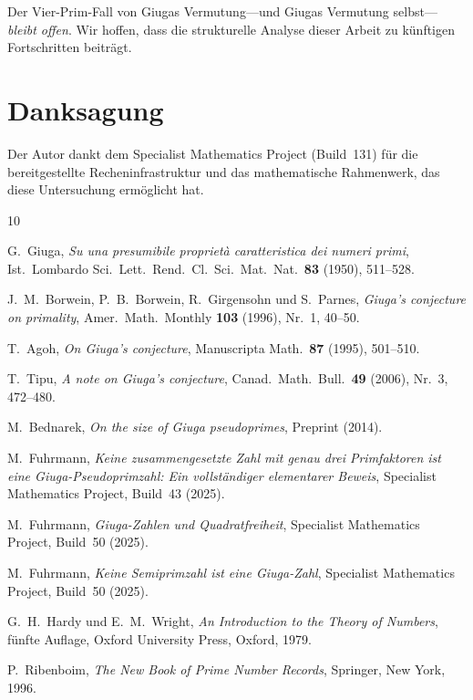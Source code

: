 \documentclass[12pt,a4paper]{amsart}
\theoremstyle{definition}
\begin{document}
Der Vier-Prim-Fall von Giugas Vermutung---und Giugas Vermutung selbst---
\emph{bleibt offen}.  Wir hoffen, dass die strukturelle Analyse dieser Arbeit
zu künftigen Fortschritten beiträgt.

\section*{Danksagung}

Der Autor dankt dem Specialist Mathematics Project (Build~131) für die
bereitgestellte Recheninfrastruktur und das mathematische Rahmenwerk, das
diese Untersuchung ermöglicht hat.

\begin{thebibliography}{10}

G.~Giuga,
\emph{Su una presumibile propriet\`a caratteristica dei numeri primi},
Ist.\ Lombardo Sci.\ Lett.\ Rend.\ Cl.\ Sci.\ Mat.\ Nat.\ \textbf{83}
(1950), 511--528.

J.~M.~Borwein, P.~B.~Borwein, R.~Girgensohn und S.~Parnes,
\emph{Giuga's conjecture on primality},
Amer.\ Math.\ Monthly \textbf{103} (1996), Nr.\ 1, 40--50.

T.~Agoh,
\emph{On Giuga's conjecture},
Manuscripta Math.\ \textbf{87} (1995), 501--510.

T.~Tipu,
\emph{A note on Giuga's conjecture},
Canad.\ Math.\ Bull.\ \textbf{49} (2006), Nr.\ 3, 472--480.

M.~Bednarek,
\emph{On the size of Giuga pseudoprimes},
Preprint (2014).

M.~Fuhrmann,
\emph{Keine zusammengesetzte Zahl mit genau drei Primfaktoren ist eine
Giuga-Pseudoprimzahl: Ein vollständiger elementarer Beweis},
Specialist Mathematics Project, Build~43 (2025).

M.~Fuhrmann,
\emph{Giuga-Zahlen und Quadratfreiheit},
Specialist Mathematics Project, Build~50 (2025).

M.~Fuhrmann,
\emph{Keine Semiprimzahl ist eine Giuga-Zahl},
Specialist Mathematics Project, Build~50 (2025).

G.~H.~Hardy und E.~M.~Wright,
\emph{An Introduction to the Theory of Numbers},
fünfte Auflage, Oxford University Press, Oxford, 1979.

P.~Ribenboim,
\emph{The New Book of Prime Number Records},
Springer, New York, 1996.

\end{thebibliography}
\end{document}
